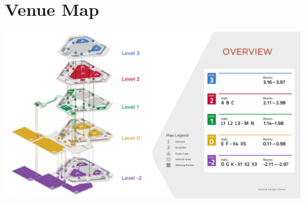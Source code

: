 \chapter{Venue Map}
\vspace*{0.2cm}
\includegraphics[width=1.0\linewidth]{examples/acl25-handbook/venue_map/acl25_map.pdf}


